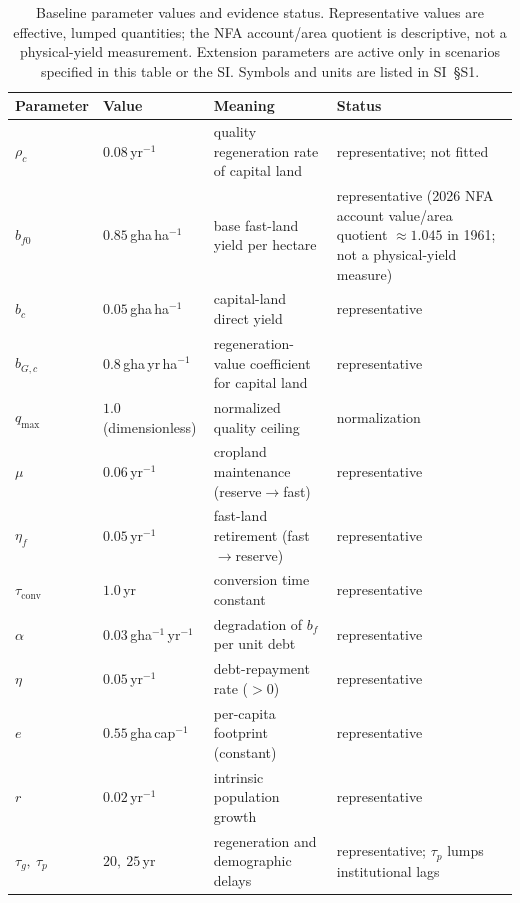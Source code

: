 \documentclass[preprint,12pt,authoryear]{elsarticle}
\newcommand{\tconv}{\tau_{\mathrm{conv}}}
\begin{document}
\begin{table}[!htbp]
\centering\footnotesize
\renewcommand{\arraystretch}{0.95}
\caption{Baseline parameter values and evidence status. Representative values are effective, lumped quantities; the NFA account/area quotient is descriptive, not a physical-yield measurement. Extension parameters are active only in scenarios specified in this table or the SI. Symbols and units are listed in SI~\S S1.}
\label{tab:params}
\setlength{\tabcolsep}{4pt}
\begin{tabularx}{\textwidth}{@{}>{\raggedright\arraybackslash}p{} >{\raggedright\arraybackslash}p{} >{\raggedright\arraybackslash}X >{\raggedright\arraybackslash}p{}@{}}
\toprule
Parameter & Value & Meaning & Status \\
\midrule
$\rho_c$ & $0.08$\,yr$^{-1}$ & quality regeneration rate of capital land & representative; not fitted \\
$b_{f0}$ & $0.85$\,gha\,ha$^{-1}$ & base fast-land yield per hectare & representative (2026 NFA account value/area quotient $\approx1.045$ in 1961; not a physical-yield measure) \\
$b_c$ & $0.05$\,gha\,ha$^{-1}$ & capital-land direct yield & representative \\
$b_{G,c}$ & $0.8$\,gha\,yr\,ha$^{-1}$ & regeneration-value coefficient for capital land & representative \\
$q_{\max}$ & $1.0$ (dimensionless) & normalized quality ceiling & normalization \\
$\mu$ & $0.06$\,yr$^{-1}$ & cropland maintenance (reserve$\to$fast) & representative \\
$\eta_f$ & $0.05$\,yr$^{-1}$ & fast-land retirement (fast$\to$reserve) & representative \\
$\tconv$ & $1.0$\,yr & conversion time constant & representative \\
$\alpha$ & $0.03$\,gha$^{-1}$\,yr$^{-1}$ & degradation of $b_f$ per unit debt & representative \\
$\eta$ & $0.05$\,yr$^{-1}$ & debt-repayment rate ($>0$) & representative \\
$e$ & $0.55$\,gha\,cap$^{-1}$ & per-capita footprint (constant) & representative \\
$r$ & $0.02$\,yr$^{-1}$ & intrinsic population growth & representative \\
$\tau_g,\ \tau_p$ & $20,\ 25$\,yr & regeneration and demographic delays & representative; $\tau_p$ lumps institutional lags \\

\end{tabularx}
\end{table}
\end{document}
